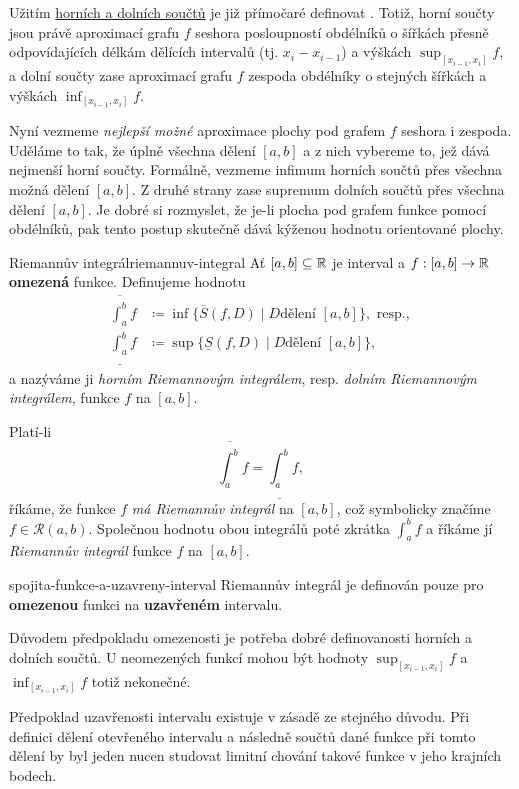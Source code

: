 Užitím \hyperref[def:horni-a-dolni-soucty]{horních a dolních součtů} je již
přímočaré definovat . Totiž, horní součty jsou právě
aproximací grafu $f$ seshora posloupností obdélníků o šířkách přesně
odpovídajících délkám dělících intervalů (tj. $x_i - x_{i-1}$) a výškách
$\sup_{[x_{i-1},x_i]} f$, a dolní součty zase aproximací grafu $f$ zespoda
obdélníky o stejných šířkách a výškách $\inf_{[x_{i-1},x_i]} f$.

Nyní vezmeme \emph{nejlepší možné} aproximace plochy pod grafem $f$ seshora i
zespoda. Uděláme to tak, že  úplně všechna dělení $[a,b]$ a z
nich vybereme to, jež dává nejmenší horní součty. Formálně, vezmeme infimum
horních součtů přes všechna možná dělení $[a,b]$. Z druhé strany zase supremum
dolních součtů přes všechna dělení $[a,b]$. Je dobré si rozmyslet, že je-li
plocha pod grafem funkce  pomocí obdélníků, pak tento postup
skutečně dává kýženou hodnotu orientované plochy.

\begin{definition}{Riemannův integrál}{riemannuv-integral}
	Ať $[a,b] \subseteq \mathbb{R}$ je interval a $f:[a,b] \to \mathbb{R}$ \textbf{omezená} funkce.
	Definujeme hodnotu
	\begin{align*}
		\overline{\int_a^{b}} f    & \coloneqq \inf \{\overline{S}(f,D) \mid D \text{
		dělení } [a,b]\}, \text{ resp.},                                               \\
		\underline{\int_{a}^{b}} f & \coloneqq \sup \{\underline{S}(f,D) \mid D \text{
			dělení } [a,b]\},
	\end{align*}
	a nazýváme ji \emph{horním Riemannovým integrálem}, resp. \emph{dolním
		Riemannovým integrálem}, funkce $f$ na $[a,b]$.

	Platí-li
	\[
		\overline{\int_{a}^{b}} f = \underline{\int_{a}^{b}} f,
	\]
	říkáme, že funkce $f$ \emph{má Riemannův integrál} na $[a,b]$, což symbolicky
	značíme $f \in \mathcal{R}(a,b)$. Společnou hodnotu obou integrálů poté
	zkrátka $\int_{a}^{b} f$ a říkáme jí \emph{Riemannův integrál} funkce $f$ na
	$[a,b]$.
\end{definition}

\begin{warning}{}{spojita-funkce-a-uzavreny-interval}
	Riemannův integrál je definován pouze pro \textbf{omezenou} funkci na
	\textbf{uzavřeném} intervalu.

	Důvodem předpokladu omezenosti je potřeba dobré definovanosti horních a dolních
	součtů. U neomezených funkcí mohou být hodnoty $\sup_{[x_{i-1},x_i]} f$ a
	$\inf_{[x_{i-1},x_i]} f$ totiž nekonečné.

	Předpoklad uzavřenosti intervalu existuje v zásadě ze stejného důvodu. Při
	definici dělení otevřeného intervalu a následně součtů dané funkce při tomto
	dělení by byl jeden nucen studovat limitní chování takové funkce v jeho
	krajních bodech.
\end{warning}

